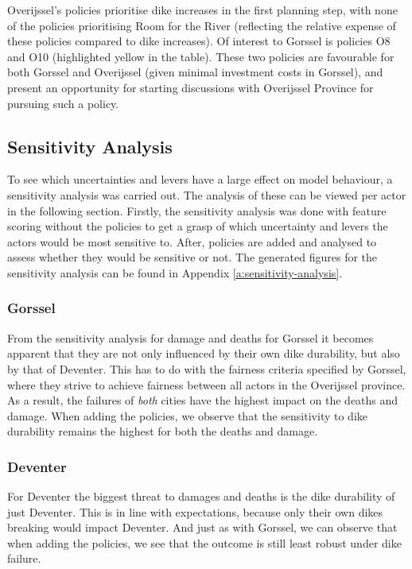 Overijssel's policies prioritise dike increases in the first planning step, with none of the policies prioritising Room for the River (reflecting the relative expense of these policies compared to dike increases). Of interest to Gorssel is policies O8 and O10 (highlighted yellow in the table). These two policies are favourable for both Gorssel and Overijssel (given minimal investment costs in Gorssel), and present an opportunity for starting discussions with Overijssel Province for pursuing such a policy.


\subsection{Sensitivity Analysis}

To see which uncertainties and levers have a large effect on model behaviour, a sensitivity analysis was carried out. The analysis of these can be viewed per actor in the following section. Firstly, the sensitivity analysis was done with feature scoring without the policies to get a grasp of which uncertainty and levers the actors would be most sensitive to. After, policies are added and analysed to assess whether they would be sensitive or not. The generated figures for the sensitivity analysis can be found in Appendix \ref{a:sensitivity-analysis}.

\subsubsection{Gorssel}

From the sensitivity analysis for damage and deaths for Gorssel it becomes apparent that they are not only influenced by their own dike durability, but also by that of Deventer. This has to do with the fairness criteria specified by Gorssel, where they strive to achieve fairness between all actors in the Overijssel province. As a result, the failures of \textit{both} cities have the highest impact on the deaths and damage. When adding the policies, we observe that the sensitivity to dike durability remains the highest for both the deaths and damage. 

\subsubsection{Deventer}

For Deventer the biggest threat to damages and deaths is the dike durability of just Deventer. This is in line with expectations, because only their own dikes breaking would impact Deventer. And just as with Gorssel, we can observe that when adding the policies, we see that the outcome is still least robust under dike failure. 

